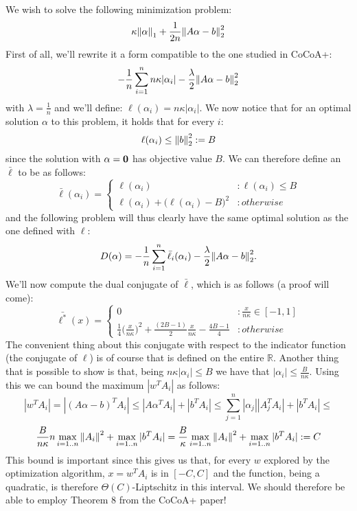 We wish to solve the following minimization problem:
$$
\kappa {\left\lVert\alpha\right\rVert}_1 + \frac{1}{2n} {\left\lVert A\alpha - b\right\rVert}_2^2
$$
First of all, we'll rewrite it a form compatible to the one studied in CoCoA+:
$$
-\frac{1}{n} \sum_{i = 1}^{n} {n \kappa |\alpha_i|} - \frac{\lambda}{2} {\left\lVert A\alpha - b\right\rVert}_2^2
$$
with $\lambda = \frac{1}{n}$ and we'll define:
$
\ell(\alpha_i) = n \kappa |\alpha_i|
$.
We now notice that for an optimal solution $\alpha$ to this problem, it holds that for every $i$:
$$
\ell(\alpha_i) \leq {\left\lVert b\right\rVert}^2_2 := B
$$
since the solution with $\alpha = \bf{0}$ has objective value $B$.
We can therefore define an $\bar{\ell}$ to be as follows:
\begin{displaymath}
    \bar{\ell}(\alpha_i) = \left\{
        \begin{array}{lr}
            \ell(\alpha_i) & : \ell(\alpha_i) \leq B \\
            \ell(\alpha_i) + \big( \ell(\alpha_i) - B\big)^2 & : otherwise
        \end{array}
    \right.
\end{displaymath}
and the following problem will thus clearly have the same optimal solution as the one defined with $\ell$:
$$
D(\alpha) = -\frac{1}{n} \sum_{i = 1}^{n} \bar{\ell}_i(\alpha_i) - \frac{\lambda}{2} {\left\lVert A\alpha - b\right\rVert}_2^2.
$$
We'll now compute the dual conjugate of $\bar{\ell}$, which is as follows (a proof will come):
\begin{displaymath}
    \bar{\ell^*}(x) = \left\{
        \begin{array}{lr}
            0 & : \frac{x}{n\kappa} \in [-1,1]  \\
            \frac{1}{4}\bigg(\frac{x}{n\kappa}\bigg)^2 + \frac{(2B-1)}{2}\frac{x}{n\kappa} - \frac{4B-1}{4} & : otherwise
        \end{array}
    \right.
\end{displaymath}
The convenient thing about this conjugate with respect to the indicator function (the conjugate of $\ell$) is of course
that is defined on the entire $\mathbb{R}$.
Another thing that is possible to show is that, being $n \kappa |\alpha_i| \leq B$ we have that
$|\alpha_i| \leq \frac{B}{n\kappa}$. Using this we can bound the maximum $|w^{T}A_i|$ as follows:
$$
|w^{T}A_i| = |(A\alpha - b)^{T}A_i| \leq |A\alpha^{T}A_i| + |b^{T}A_i| \leq
\sum_{j=1}^n |\alpha_j| |A_j^T A_i| + |b^{T}A_i| \leq
$$
$$
\frac{B}{n \kappa} n \max_{i=1..n} {\left\lVert A_i\right\rVert^2} + \max_{i=1..n} |b^T A_i| =
\frac{B}{\kappa} \max_{i=1..n} {\left\lVert A_i\right\rVert^2} + \max_{i=1..n} |b^T A_i| := C
$$
This bound is important since this gives us that, for every $w$ explored by the optimization algorithm, $x = w^{T}A_i$
is in $[-C,C]$ and the function, being a quadratic, is therefore $\Theta(C)$-Liptschitz in this interval. We should therefore
be able to employ Theorem 8 from the CoCoA+ paper!

